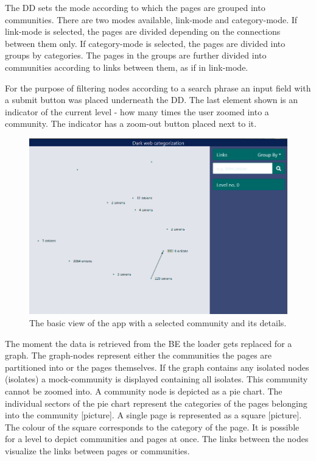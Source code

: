 The DD  sets the mode according to which the pages are grouped into communities. There are two modes available, link-mode and category-mode. If link-mode is selected, the pages are divided depending on the connections between them only. If category-mode is selected, the pages are divided into groups by categories. The pages in the groups are further divided into communities according to links between them, as if in link-mode. 

For the purpose of filtering nodes according to a search phrase an input field with a submit button was placed underneath the DD. The last element shown is an indicator of the current level - how many times the user zoomed into a community. The indicator has a zoom-out button placed next to it.
\begin{figure}[ht!]
  \centering
  \includegraphics[width=\textwidth]{Images/ZeroLevelGraphBasic.png}
  \caption{The basic view of the app with a selected community and its details.}
  \label{zeroLevelGraphBasic}
\end{figure} 

The moment the data is retrieved from the BE the loader gets replaced for a graph. The graph-nodes represent either the communities the pages are partitioned into or the pages themselves.  If the graph contains any isolated nodes (isolates) a mock-community is displayed containing all isolates. This community cannot be zoomed into. A community node is depicted as a pie chart. The individual sectors of the pie chart represent the categories of the pages belonging into the community [picture]. A single page is represented as a square [picture]. The colour of the square corresponds to the category of the page. It is possible for a level to depict communities and pages at once. The links between the nodes visualize the links between pages or communities. 

